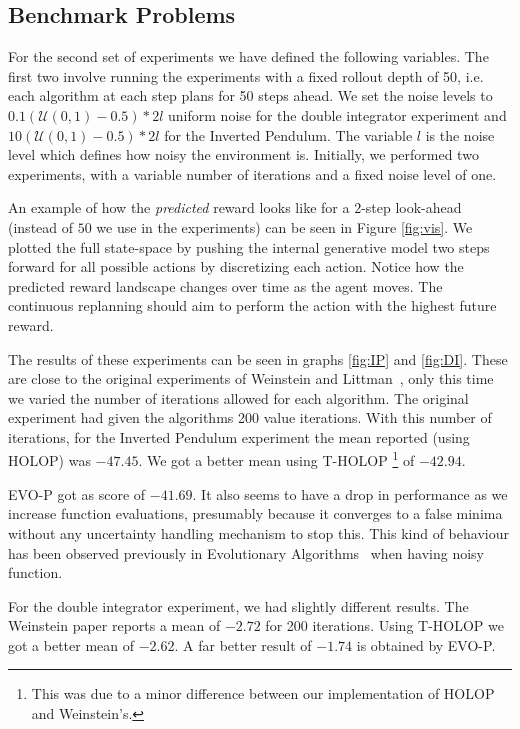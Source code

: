 \documentclass[conference]{IEEEtran}
\begin{document}
\subsection{Benchmark Problems}


For the second set of experiments we have defined the following variables. The first two involve running the experiments with a fixed rollout depth of 50, i.e. each algorithm at each step plans for 50 steps ahead. We set the noise levels to $0.1 (\mathcal{U}(0,1)-0.5)*2 l$ uniform noise for the double integrator experiment and $10 (\mathcal{U}(0,1)-0.5)*2 l$  for the Inverted Pendulum.  The variable $l$ is the noise level which defines how noisy the environment is. Initially, we performed two experiments, with a variable number of iterations and a fixed noise level of one. 

An example of how the \textit{predicted} reward looks like for a $2$-step look-ahead (instead of $50$ we use in the experiments) can be seen in Figure \ref{fig:vis}. We plotted the full state-space by pushing the internal generative model two steps forward for all possible actions by discretizing each action. Notice how the predicted reward landscape changes over time as the agent moves. The continuous replanning should aim to perform the action with the highest future reward.  



The results of these experiments can be seen in graphs  \ref{fig:IP} and \ref{fig:DI}. These are close to the original experiments of Weinstein and Littman~\cite{weinstein2012bandit}, only this time we varied the number
of iterations allowed for each algorithm. The original experiment had given the algorithms 200 value iterations. With this number of iterations, for the Inverted Pendulum experiment the mean reported (using HOLOP) was $-47.45$. We got a better mean using T-HOLOP
\footnote{This was due to a minor difference between our implementation of HOLOP and Weinstein's.}
 of $-42.94$.

 EVO-P got as score of $-41.69$. It also  seems to have a drop in performance as we increase function evaluations, presumably because it converges to a false minima without any uncertainty handling mechanism to stop this. This kind of behaviour has been observed previously in Evolutionary Algorithms~\cite{hansen2009tec} when having noisy function.

For the double integrator experiment, we had slightly different results. The Weinstein paper reports a mean of $-2.72$ for 200 iterations. Using T-HOLOP we got a better mean of $-2.62$. A far better result of $-1.74$ is obtained by EVO-P. 
\end{document}
